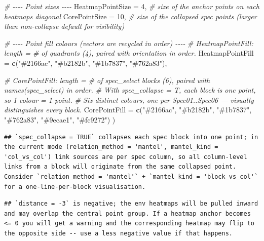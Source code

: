 \documentclass[
]{book}
\newenvironment{Shaded}{\begin{snugshade}}{\end{snugshade}}
\newcommand{\AttributeTok}[1]{\textcolor[rgb]{0.13,0.29,0.53}{#1}}
\newcommand{\CommentTok}[1]{\textcolor[rgb]{0.56,0.35,0.01}{\textit{#1}}}
\newcommand{\DecValTok}[1]{\textcolor[rgb]{0.00,0.00,0.81}{#1}}
\newcommand{\FunctionTok}[1]{\textcolor[rgb]{0.13,0.29,0.53}{\textbf{#1}}}
\newcommand{\NormalTok}[1]{#1}
\newcommand{\StringTok}[1]{\textcolor[rgb]{0.31,0.60,0.02}{#1}}
\begin{document}
\begin{Shaded}
\begin{Highlighting}[]
  \CommentTok{\# {-}{-}{-}{-} Point sizes {-}{-}{-}{-}}
  \AttributeTok{HeatmapPointSize   =} \DecValTok{4}\NormalTok{,                    }\CommentTok{\# size of the anchor points on each heatmap\textquotesingle{}s diagonal}
  \AttributeTok{CorePointSize      =} \DecValTok{10}\NormalTok{,                   }\CommentTok{\# size of the collapsed spec points (larger than non{-}collapse default for visibility)}

  \CommentTok{\# {-}{-}{-}{-} Point fill colours (vectors are recycled in order) {-}{-}{-}{-}}
  \CommentTok{\# HeatmapPointFill: length = \# of quadrants (4), paired with \textasciigrave{}orientation\textasciigrave{} in order.}
  \AttributeTok{HeatmapPointFill   =} \FunctionTok{c}\NormalTok{(}\StringTok{"\#2166ac"}\NormalTok{, }\StringTok{"\#b2182b"}\NormalTok{, }\StringTok{"\#1b7837"}\NormalTok{, }\StringTok{"\#762a83"}\NormalTok{),}

  \CommentTok{\# CorePointFill: length = \# of spec\_select blocks (6), paired with names(spec\_select) in order.}
  \CommentTok{\# With spec\_collapse = T, each block is one point, so 1 colour = 1 point.}
  \CommentTok{\# Six distinct colours, one per Spec01..Spec06 — visually distinguishes every block.}
  \AttributeTok{CorePointFill      =} \FunctionTok{c}\NormalTok{(}\StringTok{"\#2166ac"}\NormalTok{, }\StringTok{"\#b2182b"}\NormalTok{, }\StringTok{"\#1b7837"}\NormalTok{,}
                         \StringTok{"\#762a83"}\NormalTok{, }\StringTok{"\#9ecae1"}\NormalTok{, }\StringTok{"\#fc9272"}\NormalTok{)}
\NormalTok{)}
\end{Highlighting}
\end{Shaded}

\begin{verbatim}
## `spec_collapse = TRUE` collapses each spec block into one point; in the current mode (relation_method = 'mantel', mantel_kind = 'col_vs_col') link sources are per spec column, so all column-level links from a block will originate from the same collapsed point. Consider `relation_method = 'mantel'` + `mantel_kind = 'block_vs_col'` for a one-line-per-block visualisation.
\end{verbatim}

\begin{verbatim}
## `distance = -3` is negative; the env heatmaps will be pulled inward and may overlap the central point group. If a heatmap anchor becomes <= 0 you will get a warning and the corresponding heatmap may flip to the opposite side -- use a less negative value if that happens.
\end{verbatim}
\end{document}
